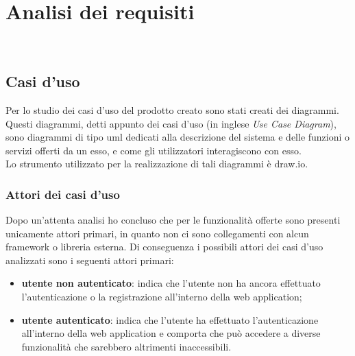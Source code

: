 
\chapter{Analisi dei requisiti}
\label{cap:analisi-requisiti}

\\

\section{Casi d'uso}
\label{sec:casi-uso}

Per lo studio dei casi d'uso del prodotto creato sono stati creati dei diagrammi.
Questi diagrammi, detti appunto dei casi d'uso (in inglese \emph{Use Case Diagram}), sono diagrammi di tipo \gls{uml} dedicati alla descrizione del sistema e delle funzioni o servizi offerti da un esso, e come gli utilizzatori interagiscono con esso.\\
Lo strumento utilizzato per la realizzazione di tali diagrammi è draw.io.

\subsection{Attori dei casi d'uso}
\label{subsec:attori}

Dopo un'attenta analisi ho concluso che per le funzionalità offerte sono presenti unicamente attori primari, in quanto non ci sono collegamenti con alcun framework o libreria esterna.
Di conseguenza i possibili attori dei casi d'uso analizzati sono i seguenti attori primari:
\begin{itemize}
	\item \textbf{utente non autenticato}: indica che l'utente non ha ancora effettuato l'autenticazione o la registrazione all'interno della web application;
	\item \textbf{utente autenticato}: indica che l'utente ha effettuato l'autenticazione all'interno della web application e comporta che può accedere a diverse funzionalità che sarebbero altrimenti inaccessibili.
\end{itemize}

